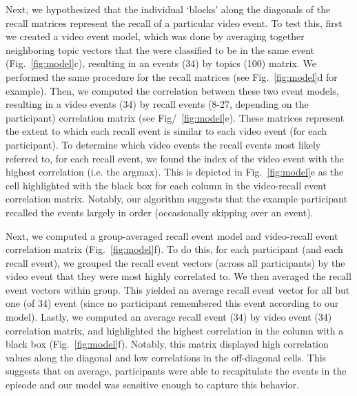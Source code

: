 \documentclass{article}
\begin{document}
{Next, we hypothesized that the individual `blocks' along the diagonals of the recall matrices represent the recall of a particular video event. To test this, first we created a video event model, which was done by averaging together neighboring topic vectors that the were classified to be in the same event (Fig.~\ref{fig:model}c), resulting in an events (34) by topics (100) matrix.  We performed the same procedure for the recall matrices (see Fig.~\ref{fig:model}d for example). Then, we computed the correlation between these two event models, resulting in a video events (34) by recall events (8-27, depending on the participant) correlation matrix (see Fig/~\ref{fig:model}e). These matrices represent the extent to which each recall event is similar to each video event (for each participant). To determine which video events the recall events most likely referred to, for each recall event, we found the index of the video event with the highest correlation (i.e. the argmax).  This is depicted in Fig.~\ref{fig:model}e as the cell highlighted with the black box for each column in the video-recall event correlation matrix. Notably, our algorithm suggests that the example participant recalled the events largely in order (occasionally skipping over an event).

Next, we computed a group-averaged recall event model and video-recall event correlation matrix (Fig.~\ref{fig:model}f).  To do this, for each participant (and each recall event), we grouped the recall event vectors (across all participants) by the video event that they were most highly correlated to. We then averaged the recall event vectors within group. This yielded an average recall event vector for all but one (of 34) event (since no participant remembered this event according to our model). Lastly, we computed an average recall event (34) by video event (34) correlation matrix, and highlighted the highest correlation in the column with a black box (Fig.~\ref{fig:model}f). Notably, this matrix displayed high correlation values along the diagonal and low correlations in the off-diagonal cells. This suggests that on average, participants were able to recapitulate the events in the episode and our model was sensitive enough to capture this behavior.

}
\end{document}
